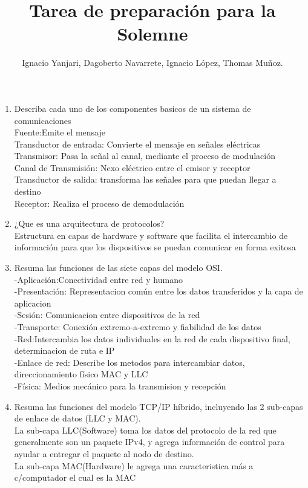 \documentclass{udparticle}
\title{Tarea de preparación para la Solemne}
\author{Ignacio Yanjari, Dagoberto Navarrete, Ignacio López, Thomas Muñoz.}
\begin{document}
\maketitle
\begin{enumerate}

\item Describa cada uno de los componentes basicos de un sistema de comunicaciones \\
    Fuente:Emite el mensaje\\
    Transductor de entrada: Convierte el mensaje en señales eléctricas\\
    Transmisor: Pasa la señal al canal, mediante el proceso de modulación\\
    Canal de Transmisión: Nexo eléctrico entre el emisor y receptor\\
    Transductor de salida: transforma las señales para que puedan llegar a destino\\
    Receptor: Realiza el proceso de demodulación \\

\item ¿Que es una arquitectura de protocolos? \\
    Estructura en capas de hardware y software que facilita el intercambio de información para que los
    dispositivos se puedan comunicar en forma exitosa\\

\item Resuma las funciones de las siete capas del modelo OSI.\\
    -Aplicación:Conectividad entre red y humano\\
    -Presentación: Representacion común entre los datos transferidos y la capa de aplicacion\\
    -Sesión: Comunicacion entre dispositivos de la red\\
    -Transporte: Conexión extremo-a-extremo y fiabilidad de los datos\\
    -Red:Intercambia los datos individuales en la red de cada dispositivo final, determinacion de ruta e IP\\
    -Enlace de red: Describe los metodos para intercambiar datos, direccionamiento físico MAC y LLC\\
    -Física: Medios mecánico para la transmision y recepción\\
\item Resuma las funciones del modelo TCP/IP híbrido, incluyendo las 2 sub-capas de enlace de datos
(LLC y MAC).\\
	La sub-capa LLC(Software) toma los datos del protocolo de la red que generalmente son un paquete IPv4, y agrega 
	información de control para ayudar a entregar el paquete al nodo de destino. \\
	La sub-capa MAC(Hardware) le agrega una caracteristica más a c/computador el cual es la MAC


\end{enumerate}
\end{document}
